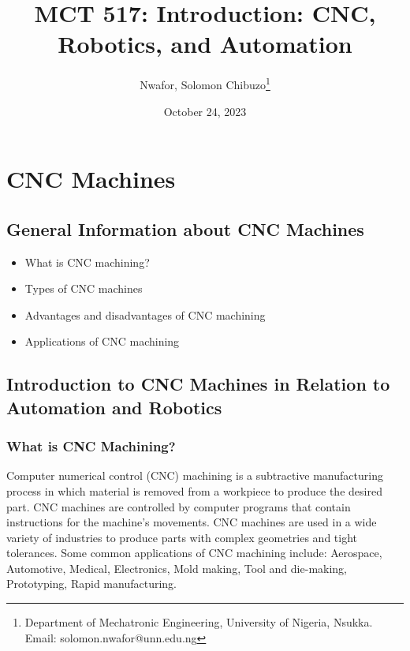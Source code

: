 \documentclass{article}
\title{MCT 517: Introduction: CNC, Robotics, and Automation}
\author{Nwafor, Solomon Chibuzo\footnote{Department of Mechatronic Engineering, University of Nigeria, Nsukka.\\ Email: solomon.nwafor@unn.edu.ng}}
\date{October 24, 2023}
\begin{document}
\maketitle
\tableofcontents
\newpage

\section{CNC Machines}
\subsection{General Information about CNC Machines}
\begin{itemize}
    \item What is CNC machining?
    \item Types of CNC machines
    \item Advantages and disadvantages of CNC machining
    \item Applications of CNC machining
\end{itemize}

\subsection{Introduction to CNC Machines in Relation to Automation and Robotics}
\subsubsection{What is CNC Machining?}
Computer numerical control (CNC) machining is a subtractive manufacturing process in which material is removed from a workpiece to produce the desired part. CNC machines are controlled by computer programs that contain instructions for the machine's movements. CNC machines are used in a wide variety of industries to produce parts with complex geometries and tight tolerances. Some common applications of CNC machining include: Aerospace, Automotive, Medical, Electronics, Mold making, Tool and die-making, Prototyping, Rapid manufacturing.
\end{document}
